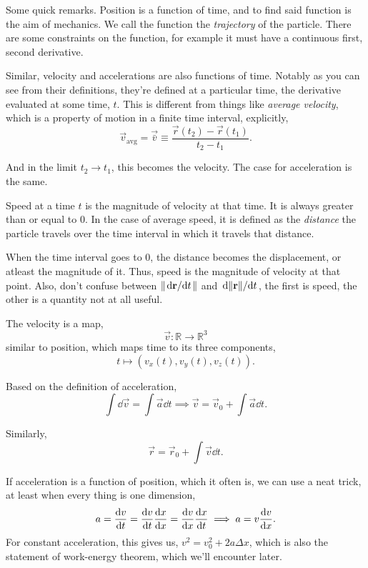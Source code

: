 \begin{remark}
    Some quick remarks. Position is a function of time, and to find said function
    is the aim of mechanics. We call the function the \textit{trajectory} of the 
    particle. There are some constraints on the function, for example it must have 
    a continuous first, second derivative. 

    Similar, velocity and accelerations are also functions of time. Notably as you can
    see from their definitions, they're defined at a particular time, the derivative
    evaluated at some time, $t$. This is different from things like \textit{average velocity}, which is a property of motion in a finite time interval, explicitly,
    \begin{equation}
        \vec{v}_{\text{avg}} = \vec{\bar{v}} \equiv \frac{\vec{r}(t_2) - \vec{r}(t_1)}{t_2 - t_1}.
    \end{equation}

    And in the limit $t_2 \to t_1$, this becomes the velocity. The case for acceleration
    is the same.

    Speed at a time $t$ is the magnitude of velocity at that time. It is always greater
    than or equal to $0$. In the case of average speed, it is defined as the \textit{distance} the particle travels over the
    time interval in which it travels that distance. 

    When the time interval goes to $0$, the distance becomes the displacement, or atleast the magnitude of 
    it. Thus, speed is the magnitude of velocity at that point. 
    Also, don't confuse between $\norm{\dv*{\mathbf{\boldsymbol{r}}}{t}}$ and $\dv*{\norm{\mathbf{\boldsymbol{r}}}}{t}$, the first is speed, 
    the other is a quantity not at all useful.
\end{remark}

The velocity is a map,
$$
\vec{v}\colon \mathbb{R} \to \mathbb{R}^3
$$
similar to position, which maps time to its three components,
$$
t \mapsto (v_x(t), v_y(t), v_z(t)).
$$

Based on the definition of acceleration,
\begin{equation}
    \int \dd{\vec{v}} = \int \vec{a}\dd{t} \implies \vec{v} = \vec{v}_0 + \int \vec{a} \dd{t}.        
\end{equation}

Similarly,
\begin{equation}
    \vec{r} = \vec{r}_0 + \int \vec{v} \dd{t}.
\end{equation}

If acceleration is a function of position, which it often is, we can use a neat trick, at least when 
every thing is one dimension,
$$
a = \dv{v}{t} = \dv{v}{t} \dv{x}{x} = \dv{v}{x} \dv{x}{t} \implies a = v \dv{v}{x}.
$$
For constant acceleration, this gives us, $v^2 = v_0^2 + 2a\Delta x$, which is also the statement of work-energy 
theorem, which we'll encounter later. 

